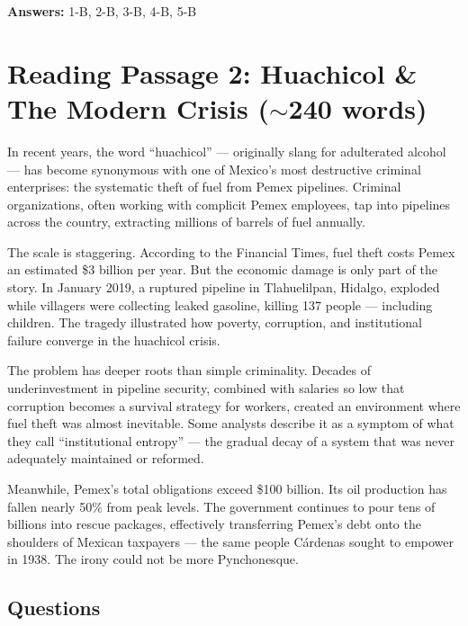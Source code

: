 \documentclass[10pt,a4paper]{article}
\begin{document}
\textbf{Answers:} 1-B, 2-B, 3-B, 4-B, 5-B

\section*{Reading Passage 2: Huachicol \& The Modern Crisis ($\sim$240 words)}

\begin{tcolorbox}[colback=white, colframe=black]
\small
In recent years, the word ``huachicol'' --- originally slang for
adulterated alcohol --- has become synonymous with one of Mexico's
most destructive criminal enterprises: the systematic theft of fuel
from Pemex pipelines. Criminal organizations, often working with
complicit Pemex employees, tap into pipelines across the country,
extracting millions of barrels of fuel annually.

The scale is staggering. According to the Financial Times, fuel
theft costs Pemex an estimated \$3 billion per year. But the
economic damage is only part of the story. In January 2019, a
ruptured pipeline in Tlahuelilpan, Hidalgo, exploded while
villagers were collecting leaked gasoline, killing 137 people ---
including children. The tragedy illustrated how poverty, corruption,
and institutional failure converge in the huachicol crisis.

The problem has deeper roots than simple criminality. Decades of
underinvestment in pipeline security, combined with salaries so low
that corruption becomes a survival strategy for workers, created an
environment where fuel theft was almost inevitable. Some analysts
describe it as a symptom of what they call ``institutional entropy''
--- the gradual decay of a system that was never adequately
maintained or reformed.

Meanwhile, Pemex's total obligations exceed \$100 billion. Its
oil production has fallen nearly 50\% from peak levels. The
government continues to pour tens of billions into rescue packages,
effectively transferring Pemex's debt onto the shoulders of Mexican
taxpayers --- the same people C\'ardenas sought to empower in 1938.
The irony could not be more Pynchonesque.
\end{tcolorbox}

\subsection*{Questions}
\end{document}
